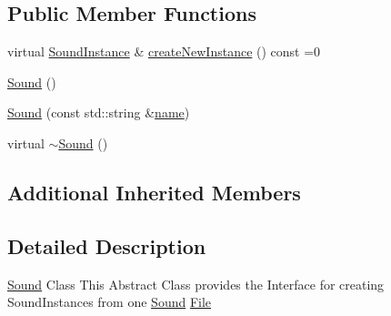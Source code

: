 \subsection*{Public Member Functions}
\begin{DoxyCompactItemize}
\item 
virtual \hyperlink{classZeta_1_1SoundInstance}{Sound\+Instance} \& \hyperlink{classZeta_1_1Sound_a2b31c94598562cddcd180ea2416af32b}{create\+New\+Instance} () const =0
\item 
\hyperlink{classZeta_1_1Sound_a36be403d2e23f674188cc170df7e086e}{Sound} ()
\item 
\hyperlink{classZeta_1_1Sound_ab3d8d66bca2f13d5f1b0592c06b77bf1}{Sound} (const std\+::string \&\hyperlink{classZeta_1_1Resource_a44c5721216f4beb31c0b3d2ef2aecf1d}{name})
\item 
virtual \hyperlink{classZeta_1_1Sound_ae775dfe50a6289c22ca1c7c97f54e366}{$\sim$\+Sound} ()
\end{DoxyCompactItemize}
\subsection*{Additional Inherited Members}


\subsection{Detailed Description}
\hyperlink{classZeta_1_1Sound}{Sound} Class This Abstract Class provides the Interface for creating Sound\+Instances from one \hyperlink{classZeta_1_1Sound}{Sound} \hyperlink{classZeta_1_1File}{File} 

